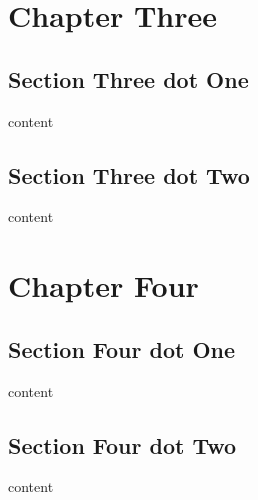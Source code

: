 \documentclass[openany]{book}
\begin{document}
\chapter{Chapter Three}

\section{Section Three dot One}

content

\section{Section Three dot Two}

content

\chapter{Chapter Four}

\section{Section Four dot One}

content

\section{Section Four dot Two}

content
\end{document}
